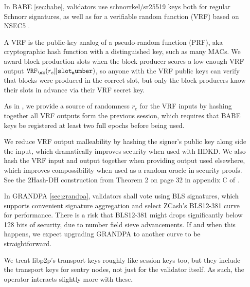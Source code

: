 In BABE \ref{sec:babe}, validators use schnorrkel/sr25519 keys both for regular Schnorr signatures, as well as for a verifiable random function (VRF) based on NSEC5 \cite{NSEC5}.  

A VRF is the public-key analog of a pseudo-random function (PRF), aka cryptographic hash function with a distinguished key, such as many MACs.  We award block production slots when the block producer scores a low enough VRF output $\mathtt{VRF}_{\sk}(r_e || \mathtt{slot_number} )$, so anyone with the VRF public keys can verify that blocks were produced in the correct slot, but only the block producers know their slots in advance via their VRF secret key.

As in \cite{Praos}, we provide a source of randomness $r_e$ for the VRF inputs by hashing together all VRF outputs form the previous session, which requires that BABE keys be registered at least two full epochs before being used.

We reduce VRF output malleability by hashing the signer's public key along side the input, which dramatically improves security when used with HDKD.  We also hash the VRF input and output together when providing output used elsewhere, which improves compossibility when used as a random oracle in security proofs.  See the 2Hash-DH construction from Theorem 2 on page 32 in appendix C of \cite{Praos}.  

In GRANDPA \ref{sec:grandpa}, validators shall vote using BLS signatures, which supports convenient signature aggregation and select ZCash's BLS12-381 curve for performance.  There is a risk that BLS12-381 might drops significantly below 128 bits of security, due to number field sieve advancements.  If and when this happens, we expect upgrading GRANDPA to another curve to be straightforward. 


We treat libp2p's transport keys roughly like session keys too, but they include the transport keys for sentry nodes, not just for the validator itself.  As such, the operator interacts slightly more with these.



